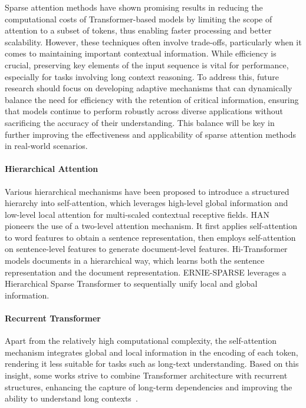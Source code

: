 \documentclass[11pt, a4paper, logo, copyright, nonumbering]{map}
\begin{document}
Sparse attention methods have shown promising results in reducing the computational costs of Transformer-based models by limiting the scope of attention to a subset of tokens, thus enabling faster processing and better scalability. However, these techniques often involve trade-offs, particularly when it comes to maintaining important contextual information. While efficiency is crucial, preserving key elements of the input sequence is vital for performance, especially for tasks involving long context reasoning. To address this, future research should focus on developing adaptive mechanisms that can dynamically balance the need for efficiency with the retention of critical information, ensuring that models continue to perform robustly across diverse applications without sacrificing the accuracy of their understanding. This balance will be key in further improving the effectiveness and applicability of sparse attention methods in real-world scenarios.

\paragraph{Hierarchical Attention}
Various hierarchical mechanisms have been proposed to introduce a structured hierarchy into self-attention, 
which leverages high-level global information and low-level local attention for multi-scaled contextual receptive fields.
HAN~\citep{han} pioneers the use of a two-level attention mechanism. It first applies self-attention to word features to obtain a sentence representation, then employs self-attention on sentence-level features to generate document-level features. 
Hi-Transformer~\citep{hi-transformer} models documents in a hierarchical way,
which learns both the sentence representation and the document representation.
ERNIE-SPARSE\cite{ERNIE-SPARSE} leverages a Hierarchical Sparse Transformer to sequentially unify local and global information.
\paragraph{Recurrent Transformer}
Apart from the relatively high computational complexity, the self-attention mechanism integrates global and local information in the encoding of each token, rendering it less suitable for tasks such as long-text understanding. Based on this insight, some works strive to combine Transformer architecture with recurrent structures, enhancing the capture of long-term dependencies and improving the ability to understand long contexts~\citep{memorizingtransformer,trams,extensibleembedding}.
\end{document}
